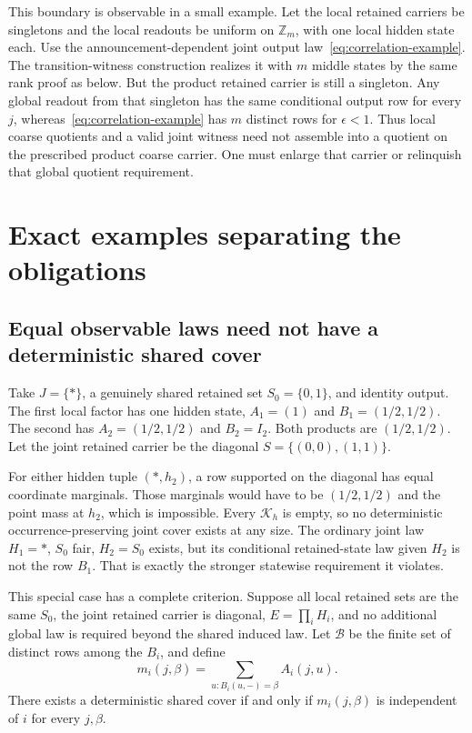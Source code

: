 \documentclass[11pt]{article}
\newcommand{\Kcal}{\mathcal K}
\theoremstyle{remark}
\begin{document}
This boundary is observable in a small example. Let the local retained carriers be singletons and the local readouts be uniform on $\mathbb Z_m$, with one local hidden state each. Use the announcement-dependent joint output law~\eqref{eq:correlation-example}. The transition-witness construction realizes it with $m$ middle states by the same rank proof as below. But the product retained carrier is still a singleton. Any global readout from that singleton has the same conditional output row for every $j$, whereas~\eqref{eq:correlation-example} has $m$ distinct rows for $\epsilon<1$. Thus local coarse quotients and a valid joint witness need not assemble into a quotient on the prescribed product coarse carrier. One must enlarge that carrier or relinquish that global quotient requirement.

\section{Exact examples separating the obligations}\label{sec:examples}

\subsection{Equal observable laws need not have a deterministic shared cover}

Take $J=\{*\}$, a genuinely shared retained set $S_0=\{0,1\}$, and identity output. The first local factor has one hidden state, $A_1=(1)$ and $B_1=(1/2,1/2)$. The second has $A_2=(1/2,1/2)$ and $B_2=I_2$. Both products are $(1/2,1/2)$. Let the joint retained carrier be the diagonal $S=\{(0,0),(1,1)\}$.

For either hidden tuple $(\ast,h_2)$, a row supported on the diagonal has equal coordinate marginals. Those marginals would have to be $(1/2,1/2)$ and the point mass at $h_2$, which is impossible. Every $\Kcal_h$ is empty, so no deterministic occurrence-preserving joint cover exists at any size. The ordinary joint law $H_1=\ast$, $S_0$ fair, $H_2=S_0$ exists, but its conditional retained-state law given $H_2$ is not the row $B_1$. That is exactly the stronger statewise requirement it violates.

This special case has a complete criterion. Suppose all local retained sets are the same $S_0$, the joint retained carrier is diagonal, $E=\prod_iH_i$, and no additional global law is required beyond the shared induced law. Let $\mathcal B$ be the finite set of distinct rows among the $B_i$, and define
\begin{equation}\label{eq:profile}
 m_i(j,\beta)=\sum_{u:B_i(u,-)=\beta}A_i(j,u).
\end{equation}
There exists a deterministic shared cover if and only if $m_i(j,\beta)$ is independent of $i$ for every $j,\beta$.
\end{document}
